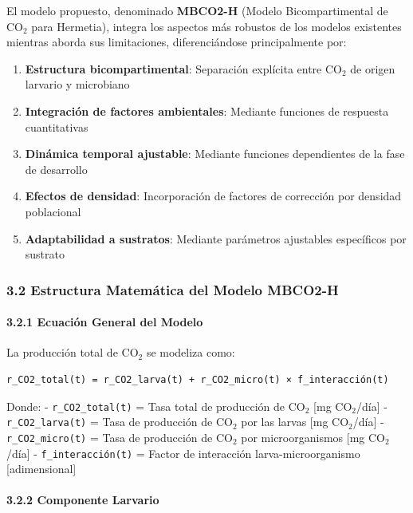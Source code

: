 \documentclass[
]{article}
\providecommand{\tightlist}{%
  \setlength{\itemsep}{0pt}\setlength{\parskip}{0pt}}
\begin{document}
El modelo propuesto, denominado \textbf{MBCO2-H} (Modelo
Bicompartimental de CO$_2$ para Hermetia), integra los aspectos más
robustos de los modelos existentes mientras aborda sus limitaciones,
diferenciándose principalmente por:

\begin{enumerate}
\def\labelenumi{\arabic{enumi}.}
\tightlist
\item
  \textbf{Estructura bicompartimental}: Separación explícita entre CO$_2$
  de origen larvario y microbiano
\item
  \textbf{Integración de factores ambientales}: Mediante funciones de
  respuesta cuantitativas
\item
  \textbf{Dinámica temporal ajustable}: Mediante funciones dependientes
  de la fase de desarrollo
\item
  \textbf{Efectos de densidad}: Incorporación de factores de corrección
  por densidad poblacional
\item
  \textbf{Adaptabilidad a sustratos}: Mediante parámetros ajustables
  específicos por sustrato
\end{enumerate}

\subsubsection{3.2 Estructura Matemática del Modelo
MBCO2-H}\label{estructura-matemuxe1tica-del-modelo-mbco2-h}

\paragraph{3.2.1 Ecuación General del
Modelo}\label{ecuaciuxf3n-general-del-modelo}

La producción total de CO$_2$ se modeliza como:

\begin{verbatim}
r_CO2_total(t) = r_CO2_larva(t) + r_CO2_micro(t) × f_interacción(t)
\end{verbatim}

Donde: - \texttt{r\_CO2\_total(t)} = Tasa total de producción de CO$_2$
{[}mg CO$_2$/día{]} - \texttt{r\_CO2\_larva(t)} = Tasa de producción de CO$_2$
por las larvas {[}mg CO$_2$/día{]} - \texttt{r\_CO2\_micro(t)} = Tasa de
producción de CO$_2$ por microorganismos {[}mg CO$_2$/día{]} -
\texttt{f\_interacción(t)} = Factor de interacción larva-microorganismo
{[}adimensional{]}

\paragraph{3.2.2 Componente Larvario}\label{componente-larvario}
\end{document}
